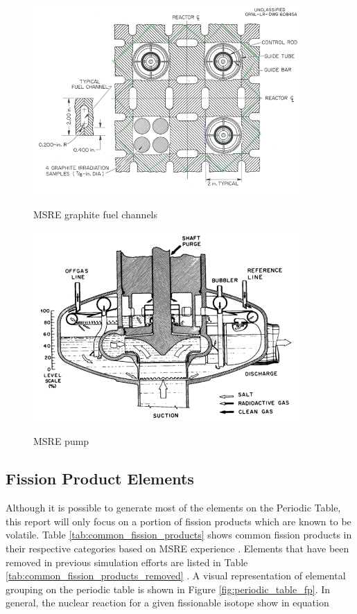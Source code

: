 \newpage

\begin{figure}[p]
  \centering
  \includegraphics[width=4in]{images/MSRE_fuel_channel.png}\\
  \caption{MSRE graphite fuel channels}
  \label{fig:MSRE_fuel_chan}
\end{figure} 

\vspace{12.7mm} %

\begin{figure}[p]
  \centering
  \includegraphics[width=4in]{images/MSRE_pump.png}\\
  \caption{MSRE pump}
  \label{fig:MSRE_pump}
\end{figure} 

\FloatBarrier
\newpage

\subsection{Fission Product Elements}
Although it is possible to generate most of the elements on the Periodic Table, this report will only focus on a portion of fission products which are known to be volatile. Table \ref{tab:common_fission_products} shows common fission products in their respective categories based on MSRE experience \cite{grimes1975}. Elements that have been removed in previous simulation efforts are listed in Table \ref{tab:common_fission_products_removed} \cite{powers2016}. A visual representation of elemental grouping on the periodic table is shown in Figure \ref{fig:periodic_table_fp}. In general, the nuclear reaction for a given fissionable isotope show in equation

